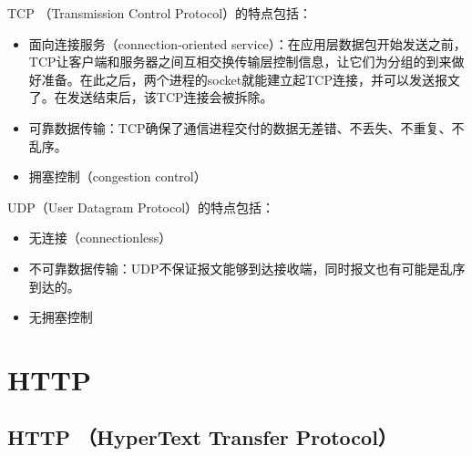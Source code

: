 TCP （Transmission Control Protocol）的特点包括：

\begin{itemize}
    \item 面向连接服务（connection-oriented service）：在应用层数据包开始发送之前，TCP让客户端和服务器之间互相交换传输层控制信息，让它们为分组的到来做好准备。在此之后，两个进程的socket就能建立起TCP连接，并可以发送报文了。在发送结束后，该TCP连接会被拆除。

    \item 可靠数据传输：TCP确保了通信进程交付的数据无差错、不丢失、不重复、不乱序。

    \item 拥塞控制（congestion control）
\end{itemize}

UDP（User Datagram Protocol）的特点包括：

\begin{itemize}
    \item 无连接（connectionless）

    \item 不可靠数据传输：UDP不保证报文能够到达接收端，同时报文也有可能是乱序到达的。

    \item 无拥塞控制
\end{itemize}

\begin{table}[H]
    \centering
    \caption{常见应用传输协议}
\end{table}

\newpage

\section{HTTP}

\subsection{HTTP （HyperText Transfer Protocol）}